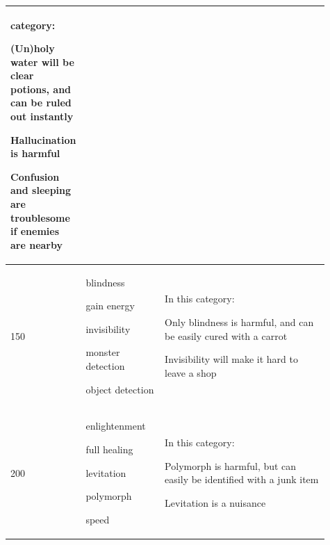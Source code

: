 \begin{longtable}{|>{\RaggedRight}p{0.12120\linewidth}|>{\RaggedRight}p{0.25169\linewidth}|>{\RaggedRight}p{0.54139\linewidth}|}
category:\begin{myitemize}\item{}(Un)holy water will be clear potions, and can be ruled out instantly\item{}Hallucination is harmful\item{}Confusion and sleeping are troublesome if enemies are nearby\end{myitemize}\\ \hline \hspace*{0pt}\ignorespaces{}\hspace*{0pt}150&\hspace*{0pt}\ignorespaces{}\hspace*{0pt}\begin{myitemize}\item{}blindness\footnotemark[151]\item{}gain energy\footnotemark[152]\item{}invisibility\footnotemark[153]\item{}monster detection\footnotemark[154]\item{}object detection\footnotemark[155]\end{myitemize}&\hspace*{0pt}\ignorespaces{}\hspace*{0pt}In this category:\begin{myitemize}\item{}Only blindness is harmful, and can be easily cured with a carrot\footnotemark[156]\item{}Invisibility will make it hard to leave a shop\end{myitemize}\\ \hline \hspace*{0pt}\ignorespaces{}\hspace*{0pt}200&\hspace*{0pt}\ignorespaces{}\hspace*{0pt}\begin{myitemize}\item{}enlightenment\footnotemark[157]\item{}full healing\footnotemark[158]\item{}levitation\footnotemark[159]\item{}polymorph\footnotemark[160]\item{}speed\footnotemark[161]\end{myitemize}&\hspace*{0pt}\ignorespaces{}\hspace*{0pt}In this category:\begin{myitemize}\item{}Polymorph is harmful, but can easily be identified with a junk item\item{}Levitation is a nuisance\end{myitemize}\\ \hline 
\end{longtable}
